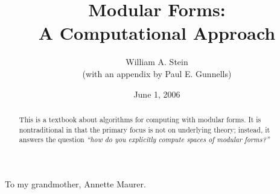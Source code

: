 \documentclass{gsm-l}
\begin{document}
\frontmatter
\title{Modular Forms:\\A Computational Approach}

\author{William A. Stein\\(with an appendix by Paul E. Gunnells)}
\address{Department of Mathematics, University of Washington}
 


\address{Department of Mathematics and Statistics, University of Massachusetts}

\date{June 1, 2006}


\begin{abstract}
This is a textbook about algorithms for computing with
modular forms.  It is nontraditional in that the primary focus is not
on underlying theory; instead, it answers the question {\em ``how do you 
explicitly compute spaces of modular forms?''}
\end{abstract}

\maketitle

\setcounter{page}{4}

\newpage
To my grandmother, Annette Maurer. 

\tableofcontents



\mainmatter





\backmatter



\printindex
\end{document}
